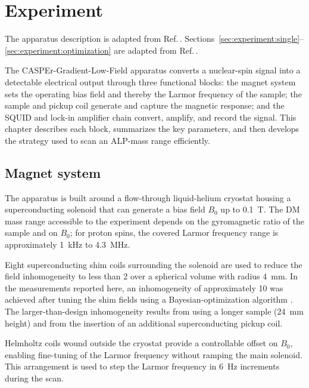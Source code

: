 \chapter{Experiment}\label{chap:experiment}
\begin{jointwork}
    The apparatus description is adapted from Ref.\,\cite{Walter2024_LFthermal}. Sections~\ref{sec:experiment:single}--\ref{sec:experiment:optimization} are adapted from Ref.\,\cite{Yuzhe2023_FrequencyScanning}.
\end{jointwork}

The CASPEr-Gradient-Low-Field apparatus converts a nuclear-spin signal into a detectable electrical output through three functional blocks: the magnet system sets the operating bias field and thereby the Larmor frequency of the sample; the sample and pickup coil generate and capture the magnetic response; and the SQUID and lock-in amplifier chain convert, amplify, and record the signal. This chapter describes each block, summarizes the key parameters, and then develops the strategy used to scan an ALP-mass range efficiently.

\section{Magnet system}\label{sec:apparatus:magnet}

The apparatus is built around a flow-through liquid-helium cryostat housing a superconducting solenoid that can generate a bias field $B_0$ up to \SI{0.1}{\tesla}. The DM mass range accessible to the experiment depends on the gyromagnetic ratio of the sample and on $B_0$; for proton spins, the covered Larmor frequency range is approximately \SI{1}{\kHz} to \SI{4.3}{\MHz}.

Eight superconducting shim coils surrounding the solenoid are used to reduce the field inhomogeneity to less than \SI{2}{\ppm} over a spherical volume with radius \SI{4}{\mm}. In the measurements reported here, an inhomogeneity of approximately \SI{10}{\ppm} was achieved after tuning the shim fields using a Bayesian-optimization algorithm \cite{ShimmingPaper}. The larger-than-design inhomogeneity results from using a longer sample (\SI{24}{\mm} height) and from the insertion of an additional superconducting pickup coil.

Helmholtz coils wound outside the cryostat provide a controllable offset on $B_0$, enabling fine-tuning of the Larmor frequency without ramping the main solenoid. This arrangement is used to step the Larmor frequency in \SI{6}{\Hz} increments during the scan.

